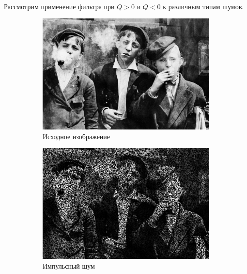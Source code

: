 Рассмотрим применение фильтра при $Q > 0$ и $Q < 0$ к различным типам шумов. 

\begin{figure}[ht!] 
    \centering
    \begin{subfigure}[b]{0.5\linewidth}
        \centering
        \includegraphics[width=0.95\linewidth]{../lewis-hine-taschen-main-3.jpg} 
        \caption{Исходное изображение} 
        \label{contraharmonic_-1.85:a} 
        \vspace{4ex}
    \end{subfigure}%
    \begin{subfigure}[b]{0.5\linewidth}
      \centering
      \includegraphics[width=0.95\linewidth]{../Contraharmonic_Filter/Contraharmonic_Impulse_noise_(m,n=(3,_3),q=-1.85).jpg} 
      \caption{Импульсный шум} 
      \label{contraharmonic_-1.85:b} 
      \vspace{4ex}
    \end{subfigure}
    \begin{subfigure}[b]{0.5\linewidth}

\end{subfigure}
\end{figure}
